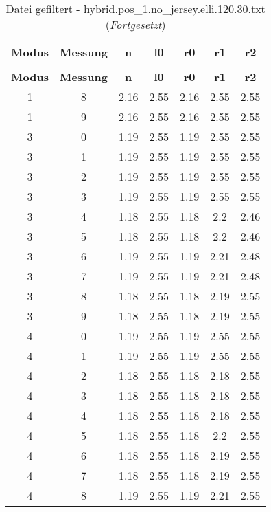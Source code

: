 \begin{longtable}{|c|c||c||c||c|c|c|}
	\caption{Datei gefiltert - hybrid.pos\_1.no\_jersey.elli.120.30.txt} \label{tab:hybrid.pos-1.no-jersey.elli.120.30.txt} \\ \hline
	\textbf{Modus} & \textbf{Messung} & \textbf{n} & \textbf{l0} & \textbf{r0} & \textbf{r1} & \textbf{r2}\\ \hline
	\endfirsthead
	\caption[]{Datei gefiltert - hybrid.pos\_1.no\_jersey.elli.120.30.txt (\emph{Fortgesetzt})} \\ \hline
	\textbf{Modus} & \textbf{Messung} & \textbf{n} & \textbf{l0} & \textbf{r0} & \textbf{r1} & \textbf{r2}\\ \hline
	\endhead
	1 & 8 & 2.16 & 2.55 & 2.16 & 2.55 & 2.55 \\ \hline
	1 & 9 & 2.16 & 2.55 & 2.16 & 2.55 & 2.55 \\ \hline
	3 & 0 & 1.19 & 2.55 & 1.19 & 2.55 & 2.55 \\ \hline
	3 & 1 & 1.19 & 2.55 & 1.19 & 2.55 & 2.55 \\ \hline
	3 & 2 & 1.19 & 2.55 & 1.19 & 2.55 & 2.55 \\ \hline
	3 & 3 & 1.19 & 2.55 & 1.19 & 2.55 & 2.55 \\ \hline
	3 & 4 & 1.18 & 2.55 & 1.18 & 2.2 & 2.46 \\ \hline
	3 & 5 & 1.18 & 2.55 & 1.18 & 2.2 & 2.46 \\ \hline
	3 & 6 & 1.19 & 2.55 & 1.19 & 2.21 & 2.48 \\ \hline
	3 & 7 & 1.19 & 2.55 & 1.19 & 2.21 & 2.48 \\ \hline
	3 & 8 & 1.18 & 2.55 & 1.18 & 2.19 & 2.55 \\ \hline
	3 & 9 & 1.18 & 2.55 & 1.18 & 2.19 & 2.55 \\ \hline
	4 & 0 & 1.19 & 2.55 & 1.19 & 2.55 & 2.55 \\ \hline
	4 & 1 & 1.19 & 2.55 & 1.19 & 2.55 & 2.55 \\ \hline
	4 & 2 & 1.18 & 2.55 & 1.18 & 2.18 & 2.55 \\ \hline
	4 & 3 & 1.18 & 2.55 & 1.18 & 2.18 & 2.55 \\ \hline
	4 & 4 & 1.18 & 2.55 & 1.18 & 2.18 & 2.55 \\ \hline
	4 & 5 & 1.18 & 2.55 & 1.18 & 2.2 & 2.55 \\ \hline
	4 & 6 & 1.18 & 2.55 & 1.18 & 2.19 & 2.55 \\ \hline
	4 & 7 & 1.18 & 2.55 & 1.18 & 2.19 & 2.55 \\ \hline
	4 & 8 & 1.19 & 2.55 & 1.19 & 2.21 & 2.55 \\ \hline

\end{longtable}
